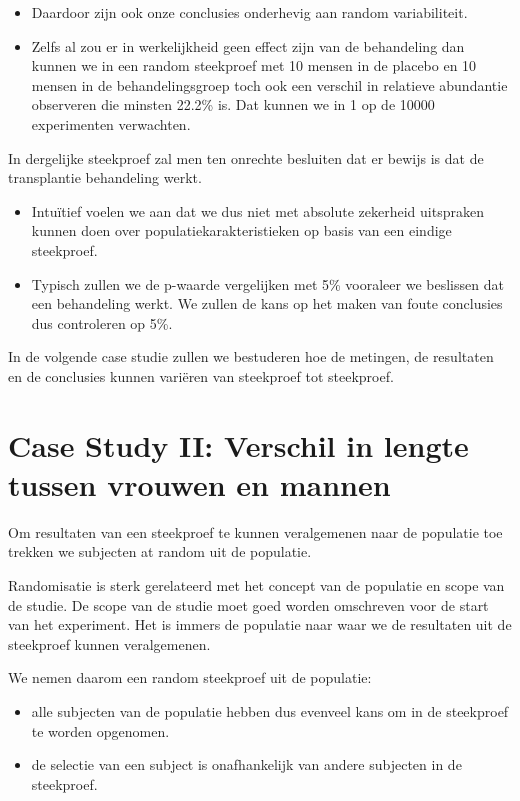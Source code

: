 \documentclass[
  12pt,dutch,coursenotes]{book}
\theoremstyle{definition}
\theoremstyle{definition}
\theoremstyle{definition}
\theoremstyle{definition}
\theoremstyle{remark}
\begin{document}
\begin{itemize}
\item
  Daardoor zijn ook onze conclusies onderhevig aan random variabiliteit.
\item
  Zelfs al zou er in werkelijkheid geen effect zijn van de behandeling dan kunnen we in een random steekproef met 10 mensen in de placebo en 10 mensen in de behandelingsgroep toch ook een verschil in relatieve abundantie observeren die minsten 22.2\% is. Dat kunnen we in 1 op de 10000 experimenten verwachten.
\end{itemize}

In dergelijke steekproef zal men ten onrechte besluiten dat er bewijs is dat de transplantie behandeling werkt.

\begin{itemize}
\item
  Intuïtief voelen we aan dat we dus niet met absolute zekerheid uitspraken kunnen doen over populatiekarakteristieken op basis van een eindige steekproef.
\item
  Typisch zullen we de p-waarde vergelijken met 5\% vooraleer we beslissen dat een behandeling werkt. We zullen de kans op het maken van foute conclusies dus controleren op 5\%.
\end{itemize}

In de volgende case studie zullen we bestuderen hoe de metingen, de resultaten en de conclusies kunnen variëren van steekproef tot steekproef.

\hypertarget{case-study-ii-verschil-in-lengte-tussen-vrouwen-en-mannen}{%
\section{Case Study II: Verschil in lengte tussen vrouwen en mannen}\label{case-study-ii-verschil-in-lengte-tussen-vrouwen-en-mannen}}

Om resultaten van een steekproef te kunnen veralgemenen naar de populatie toe trekken we subjecten at random uit de populatie.

Randomisatie is sterk gerelateerd met het concept van de populatie en scope van de studie.
De scope van de studie moet goed worden omschreven voor de start van het experiment. Het is immers de populatie naar waar we de resultaten uit de steekproef kunnen veralgemenen.

We nemen daarom een random steekproef uit de populatie:

\begin{itemize}
\item
  alle subjecten van de populatie hebben dus evenveel kans om in de steekproef te worden opgenomen.
\item
  de selectie van een subject is onafhankelijk van andere subjecten in de steekproef.
\end{itemize}
\end{document}
